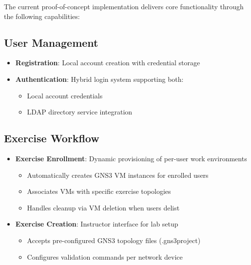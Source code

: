 The current proof-of-concept implementation delivers core functionality through the following capabilities:

\subsection{User Management}
\begin{itemize}
    \item \textbf{Registration}: Local account creation with credential storage
    \item \textbf{Authentication}: Hybrid login system supporting both:
    \begin{itemize}
        \item Local account credentials
        \item LDAP directory service integration
    \end{itemize}
\end{itemize}

\subsection{Exercise Workflow}
\begin{itemize}
    \item \textbf{Exercise Enrollment}: Dynamic provisioning of per-user work environments
    \begin{itemize}
        \item Automatically creates GNS3 VM instances for enrolled users
        \item Associates VMs with specific exercise topologies
        \item Handles cleanup via VM deletion when users delist
    \end{itemize}
    \item \textbf{Exercise Creation}: Instructor interface for lab setup
    \begin{itemize}
        \item Accepts pre-configured GNS3 topology files (.gns3project)
        \item Configures validation commands per network device
    \end{itemize}
\end{itemize}

